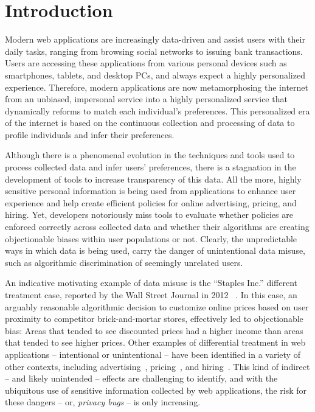 
\section{Introduction}

Modern web applications are increasingly data-driven and assist users
with their daily tasks, ranging from browsing social networks to
issuing bank transactions. Users are accessing these applications from
various personal devices such as smartphones, tablets, and desktop PCs,
and always expect a highly personalized experience. Therefore, modern
applications are now metamorphosing the internet from an unbiased, impersonal
service into a highly personalized service that dynamically reforms to match
each individual's preferences. This personalized era of the internet
is based on the continuous collection and processing of data to profile individuals
and infer their preferences.

Although there is a phenomenal evolution in the techniques and tools used to
process collected data and infer users' preferences, there is a stagnation
in the development of tools to increase transparency of
this data. All the more,  highly sensitive personal information is being
used from applications to enhance user experience and help create efficient
policies for online advertising, pricing, and hiring.
Yet, developers notoriously miss tools to evaluate whether policies are
enforced correctly across collected data and whether their algorithms are
creating objectionable biases within user populations or not. Clearly,
the unpredictable ways in which data is being used, carry the danger of
unintentional data misuse, such as algorithmic discrimination of seemingly
unrelated users.

An indicative motivating example of data misuse is the ``Staples Inc.''
different treatment case, reported by the Wall Street Journal in 2012
~\cite{Staples}. In this case, an arguably reasonable algorithmic decision
to customize online prices based on user proximity to competitor
brick-and-mortar stores, effectively led to objectionable bias:
Areas that tended to see discounted prices had a higher income than areas
that tended to see higher prices. Other examples of differential treatment in
web applications -- intentional or unintentional -- have been identified in a
variety of other contexts, including
advertising~\cite{Sweeney:AdDiscrimination},
pricing~\cite{PriceDiscrimination}, and
hiring~\cite{HiringDiscrimination}. This kind of indirect -- and likely
unintended -- effects are challenging to identify, and with the ubiquitous use
of sensitive information collected by web applications, the risk for these
dangers -- or, {\em privacy bugs} -- is only increasing.

